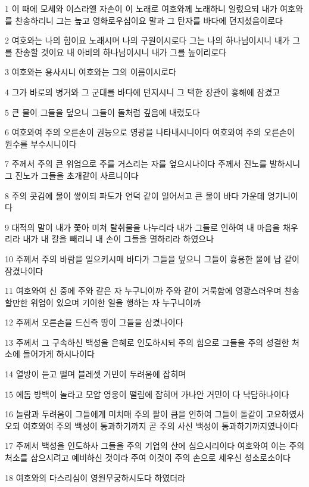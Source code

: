 \par 1 이 때에 모세와 이스라엘 자손이 이 노래로 여호와께 노래하니 일렀으되 내가 여호와를 찬송하리니 그는 높고 영화로우심이요 말과 그 탄자를 바다에 던지셨음이로다
\par 2 여호와는 나의 힘이요 노래시며 나의 구원이시로다 그는 나의 하나님이시니 내가 그를 찬송할 것이요 내 아비의 하나님이시니 내가 그를 높이리로다
\par 3 여호와는 용사시니 여호와는 그의 이름이시로다
\par 4 그가 바로의 병거와 그 군대를 바다에 던지시니 그 택한 장관이 홍해에 잠겼고
\par 5 큰 물이 그들을 덮으니 그들이 돌처럼 깊음에 내렸도다
\par 6 여호와여 주의 오른손이 권능으로 영광을 나타내시니이다 여호와여 주의 오른손이 원수를 부수시니이다
\par 7 주께서 주의 큰 위엄으로 주를 거스리는 자를 엎으시나이다 주께서 진노를 발하시니 그 진노가 그들을 초개같이 사르니이다
\par 8 주의 콧김에 물이 쌓이되 파도가 언덕 같이 일어서고 큰 물이 바다 가운데 엉기니이다
\par 9 대적의 말이 내가 쫓아 미쳐 탈취물을 나누리라 내가 그들로 인하여 내 마음을 채우리라 내가 내 칼을 빼리니 내 손이 그들을 멸하리라 하였으나
\par 10 주께서 주의 바람을 일으키시매 바다가 그들을 덮으니 그들이 흉용한 물에 납 같이 잠겼나이다
\par 11 여호와여 신 중에 주와 같은 자 누구니이까 주와 같이 거룩함에 영광스러우며 찬송할만한 위엄이 있으며 기이한 일을 행하는 자 누구니이까
\par 12 주께서 오른손을 드신즉 땅이 그들을 삼켰나이다
\par 13 주께서 그 구속하신 백성을 은혜로 인도하시되 주의 힘으로 그들을 주의 성결한 처소에 들어가게 하시나이다
\par 14 열방이 듣고 떨며 블레셋 거민이 두려움에 잡히며
\par 15 에돔 방백이 놀라고 모압 영웅이 떨림에 잡히며 가나안 거민이 다 낙담하나이다
\par 16 놀람과 두려움이 그들에게 미치매 주의 팔이 큼을 인하여 그들이 돌같이 고요하였사오되 여호와여 주의 백성이 통과하기까지 곧 주의 사신 백성이 통과하기까지였나이다
\par 17 주께서 백성을 인도하사 그들을 주의 기업의 산에 심으시리이다 여호와여 이는 주의 처소를 삼으시려고 예비하신 것이라 주여 이것이 주의 손으로 세우신 성소로소이다
\par 18 여호와의 다스리심이 영원무궁하시도다 하였더라
